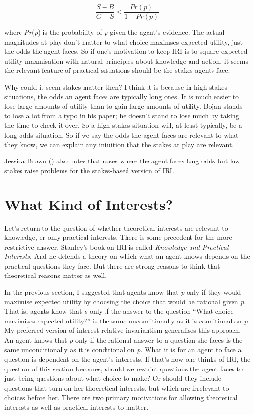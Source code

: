 \documentclass[
  11pt,
  letterpaper,
  DIV=11,
  numbers=noendperiod,
  twoside]{scrartcl}
\begin{document}
\[
\frac{S-B}{G-S} < \frac{Pr(p)}{1-Pr(p)}
\]

where \emph{Pr}(\emph{p}) is the probability of \emph{p} given the
agent's evidence. The actual magnitudes at play don't matter to what
choice maximses expected utility, just the odds the agent faces. So if
one's motivation to keep IRI is to square expected utility maxmisation
with natural principles about knowledge and action, it seems the
relevant feature of practical situations should be the stakes agents
face.

Why could it seem stakes matter then? I think it is because in high
stakes situations, the odds an agent faces are typically long ones. It
is much easier to lose large amounts of utility than to gain large
amounts of utility. Bojan stands to lose a lot from a typo in his paper;
he doesn't stand to lose much by taking the time to check it over. So a
high stakes situation will, at least typically, be a long odds
situation. So if we say the odds the agent faces are relevant to what
they know, we can explain any intuition that the stakes at play are
relevant.

Jessica Brown () also notes that
cases where the agent faces long odds but low stakes raise problems for
the stakes-based version of IRI.

\section{What Kind of Interests?}\label{whatkindofinterests}

Let's return to the question of whether theoretical interests are
relevant to knowledge, or only practical interests. There is some
precedent for the more restrictive answer. Stanley's book on IRI is
called \emph{Knowledge and Practical Interests}. And he defends a theory
on which what an agent knows depends on the practical questions they
face. But there are strong reasons to think that theoretical reasons
matter as well.

In the previous section, I suggested that agents know that \emph{p} only
if they would maximise expected utility by choosing the choice that
would be rational given \emph{p}. That is, agents know that \emph{p}
only if the answer to the question ``What choice maximises expected
utility?'' is the same unconditionally as it is conditional on \emph{p}.
My preferred version of interest-relative invariantism generalises this
approach. An agent knows that \emph{p} only if the rational answer to a
question she faces is the same unconditionally as it is conditional on
\emph{p}. What it is for an agent to face a question is dependent on the
agent's interests. If that's how one thinks of IRI, the question of this
section becomes, should we restrict questions the agent faces to just
being questions about what choice to make? Or should they include
questions that turn on her thoeretical interests, but which are
irrelevant to choices before her. There are two primary motivations for
allowing theoretical interests as well as practical interests to matter.
\end{document}
